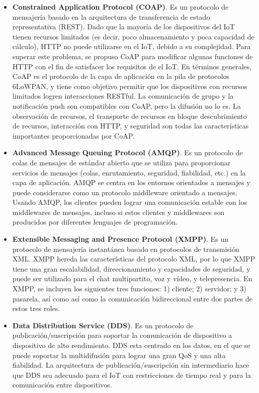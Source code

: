 {\begin{itemize}
    \item \textbf{Constrained Application Protocol (COAP)}. Es un protocolo de mensajería basado en la arquitectura de transferencia de estado representativa (REST). Dado que la mayoría de los dispositivos del IoT tienen recursos limitados (es decir, poco almacenamiento y poca capacidad de cálculo), HTTP no puede utilizarse en el IoT, debido a su complejidad. Para superar este problema, se propuso CoAP para modificar algunas funciones de HTTP con el fin de satisfacer los requisitos de el IoT. En términos generales, CoAP es el protocolo de la capa de aplicación en la pila de protocolos 6LoWPAN, y tiene como objetivo permitir que los dispositivos con recursos limitados logren interacciones RESTful. La comunicación de grupo y la notificación push son compatibles con CoAP, pero la difusión no lo es. La observación de recursos, el transporte de recursos en bloque descubrimiento de recursos, interacción con HTTP, y seguridad son todas las características importantes proporcionadas por CoAP.
    \item \textbf{Advanced Message Queuing Protocol (AMQP)}. Es un protocolo de colas de mensajes de estándar abierto que se utiliza para proporcionar servicios de mensajes (colas, enrutamiento, seguridad, fiabilidad, etc.) en la capa de aplicación. AMQP se centra en los entornos orientados a mensajes y puede considerarse como un protocolo middleware orientado a mensajes. Usando AMQP, los clientes pueden lograr una comunicación estable con los middlewares de mensajes, incluso si estos clientes y middlewares son producidos por diferentes lenguajes de programación.
    \item \textbf{Extensible Messaging and Presence Protocol (XMPP)}. Es un protocolo de mensajería instantánea basado en protocolos de transmisión XML. XMPP hereda las características del protocolo XML, por lo que XMPP tiene una gran escalabilidad, direccionamiento y capacidades de seguridad, y puede ser utilizado para el chat multipartito, voz y vídeo, y telepresencia. En XMPP, se incluyen los siguientes tres funciones: 1) cliente; 2) servidor; y 3) pasarela, así como así como la comunicación bidireccional entre dos partes de estos tres roles.
    \item \textbf{Data Distribution Service (DDS)}. Es un protocolo de publicación/suscripción para soportar la comunicación de dispositivo a dispositivo de alto rendimiento. DDS esta centrado en los datos, en el que se puede soportar la multidifusión para lograr una gran QoS y una alta fiabilidad. La arquitectura de publicación/suscripción sin intermediario hace que DDS sea adecuado para el IoT con restricciones de tiempo real y para la comunicación entre dispositivos.\cite{lin2017survey}
\end{itemize}

}
